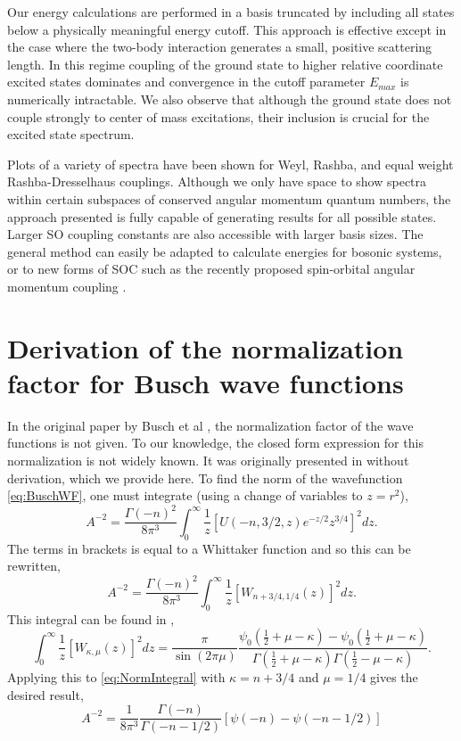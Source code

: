 \documentclass[%
 preprint,
 amsmath,amssymb,
 aps,
]{revtex4-1}
\begin{document}
Our energy calculations are performed in a basis truncated by including all states below a physically meaningful energy cutoff. This approach is effective except in the case where the two-body interaction generates a small, positive scattering length. In this regime coupling of the ground state to higher relative coordinate excited states dominates and convergence in the cutoff parameter $E_{max}$ is numerically intractable. We also observe that although the ground state does not couple strongly to center of mass excitations, their inclusion is crucial for the excited state spectrum. 

Plots of a variety of spectra have been shown for Weyl, Rashba, and equal weight Rashba-Dresselhaus couplings. Although we only have space to show spectra within certain subspaces of conserved angular momentum quantum numbers, the approach presented is fully capable of generating results for all possible states. Larger SO coupling constants are also accessible with larger basis sizes. The general method can easily be adapted to calculate energies for bosonic systems, or to new forms of SOC such as the recently proposed spin-orbital angular momentum coupling \cite{2014arXiv1411.1737S}.




\appendix*
\section{Derivation of the normalization factor for Busch wave functions}
In the original paper by Busch et al \cite{Busch}, the normalization factor of the wave functions is not given. To our knowledge, the closed form expression for this normalization is not widely known. It was originally presented in \cite{PhysRevA.85.053614} without derivation, which we provide here. To find the norm of the wavefunction \eqref{eq:BuschWF}, one must integrate (using a change of variables to $z=r^2$),
\begin{equation}\label{eq:NormIntegral}
A^{-2}=\frac{\Gamma(-n)^2}{8\pi^3}  \int_0^\infty \frac{1}{z}\left[U(-n,3/2,z)e^{-z/2} z^{3/4} \right]^2  dz.
\end{equation}
The terms in brackets is equal to a Whittaker function \cite{DLMF} and so this can be rewritten,
\begin{equation}
A^{-2}=\frac{\Gamma(-n)^2}{8\pi^3}  \int_0^\infty \frac{1}{z}\left[W_{n+3/4,1/4}(z) \right]^2  dz.
\end{equation}
This integral can be found in \cite{GradshteynRyzhik},
\begin{equation}
\int_0^\infty \frac{1}{z}\left[W_{\kappa,\mu}(z) \right]^2  dz=\frac{\pi}{\sin (2\pi \mu)}\frac{\psi_0(\frac{1}{2}+\mu-\kappa)-\psi_0(\frac{1}{2}+\mu-\kappa)}{\Gamma(\frac{1}{2}+\mu-\kappa)\Gamma(\frac{1}{2}-\mu-\kappa)}.
\end{equation}
Applying this to \eqref{eq:NormIntegral} with $\kappa=n+3/4$ and $\mu=1/4$ gives the desired result,
\begin{equation}
A^{-2}=\frac{1}{8\pi^3}  \frac{\Gamma (-n)}{\Gamma(-n-1/2)}\left[\psi(-n)-\psi(-n-1/2)\right]
\end{equation}
\end{document}
